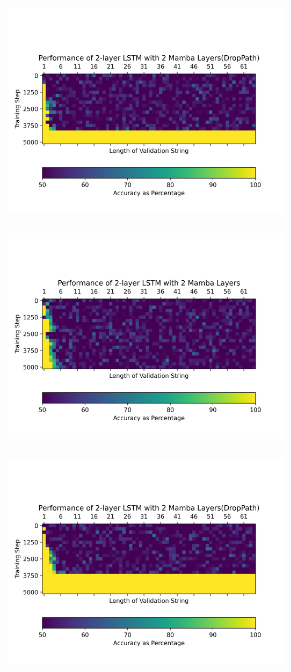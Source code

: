 \begin{figure}
\begin{subfigure}{0.5\textwidth}
\begin{center}
        \includegraphics[width=0.8\textwidth]{figures/parity_lstm_True_4_1.png.png}
        \end{center}
    \end{subfigure}
    \begin{subfigure}{0.5\textwidth}
        \begin{center}
        \includegraphics[width=0.8\textwidth]{figures/parity_lstm_False_4_2.png.png}
        \end{center}
    \end{subfigure}\begin{subfigure}{0.5\textwidth}
        \begin{center}
        \includegraphics[width=0.8\textwidth]{figures/parity_lstm_True_4_2.png.png}

\end{center}
\end{subfigure}
\end{figure}
